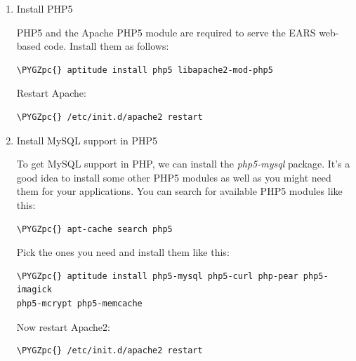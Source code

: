 \documentclass[letterpaper,10pt,english]{sphinxmanual}
\def\PYGZpc{\char`\%}
\begin{document}
\begin{enumerate}
\item {} 
Install PHP5

PHP5 and the Apache PHP5 module are required to serve the EARS web-based
code.  Install them as follows:

\begin{Verbatim}[commandchars=\\\{\},formatcom=\footnotesize]
\PYGZpc{} aptitude install php5 libapache2-mod-php5
\end{Verbatim}

Restart Apache:

\begin{Verbatim}[commandchars=\\\{\},formatcom=\footnotesize]
\PYGZpc{} /etc/init.d/apache2 restart
\end{Verbatim}

\item {} 
Install MySQL support in PHP5

To get MySQL support in PHP, we can install the \emph{php5-mysql} package. It's
a good idea to install some other PHP5 modules as well as you might need
them for your applications. You can search for available PHP5 modules like
this:

\begin{Verbatim}[commandchars=\\\{\},formatcom=\footnotesize]
\PYGZpc{} apt-cache search php5
\end{Verbatim}

Pick the ones you need and install them like this:

\begin{Verbatim}[commandchars=\\\{\},formatcom=\footnotesize]
\PYGZpc{} aptitude install php5-mysql php5-curl php-pear php5-imagick
php5-mcrypt php5-memcache
\end{Verbatim}

Now restart Apache2:

\begin{Verbatim}[commandchars=\\\{\},formatcom=\footnotesize]
\PYGZpc{} /etc/init.d/apache2 restart
\end{Verbatim}

\end{enumerate}
\end{document}
